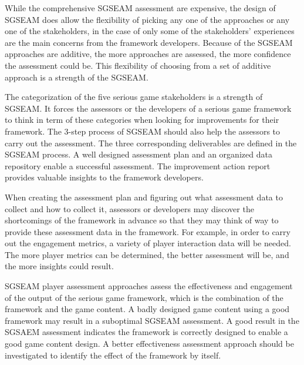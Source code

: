While the comprehensive SGSEAM assessment are expensive, the design of SGSEAM does allow the flexibility of picking any one of the approaches or any one of the stakeholders, in the case of only some of the stakeholders' experiences are the main concerns from the framework developers. Because of the SGSEAM approaches are additive, the more approaches are assessed, the more confidence the assessment could be. This flexibility of choosing from a set of additive approach is a strength of the SGSEAM.

The categorization of the five serious game stakeholders is a strength of SGSEAM. It forces the assessors or the developers of a serious game framework to think in term of these categories when looking for improvements for their framework. The 3-step process of SGSEAM should also help the assessors to carry out the assessment. The three corresponding deliverables are defined in the SGSEAM process. A well designed assessment plan and an organized data repository enable a successful assessment. The improvement action report provides valuable insights to the framework developers.

When creating the assessment plan and figuring out what assessment data to collect and how to collect it, assessors or developers may discover the shortcomings of the framework in advance so that they may think of way to provide these assessment data in the framework. For example, in order to carry out the engagement metrics, a variety of player interaction data will be needed. The more player metrics can be determined, the better assessment will be, and the more insights could result.

SGSEAM player assessment approaches assess the effectiveness and engagement of the output of the serious game framework, which is the combination of the framework and the game content. A badly designed game content using a good framework may result in a suboptimal SGSEAM assessment. A good result in the SGSAEM assessment indicates the framework is correctly designed to enable a good game content design. A better effectiveness assessment approach should be investigated to identify the effect of the framework by itself.

